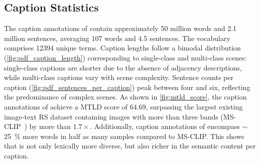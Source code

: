 \subsection{Caption Statistics\label{sec:statistics}}
The caption annotations of \bentxt{} contain approximately \num{50} million words and \num{2.1} million sentences, averaging 107 words and \num{4.5} sentences. 
The vocabulary comprises \num{12394} unique terms. 
Caption lengths follow a bimodal distribution (\cref{fig:pdf_caption_length}) corresponding to single-class and multi-class scenes: single-class captions are shorter due to the absence of adjacency descriptions, while multi-class captions vary with scene complexity. 
Sentence counts per caption (\cref{fig:pdf_sentences_per_caption}) peak between four and six, reflecting the predominance of complex scenes. 
As shown in \cref{fig:mtld_score}, the caption annotations of \bentxt{} achieve a \ac{MTLD} score of \num{64.69}, surpassing the largest existing image-text \ac{RS} dataset containing images with more than three bands (MS-CLIP~\cite{marimo2025beyond}) by more than $1.7\times$. 
Additionally, caption annotations of \bentxt{} encompass $\sim$\SI{25}{\percent} more words in half as many samples compared to MS-CLIP. This shows that \bentxt{} is not only lexically more diverse, but also richer in the semantic content per caption.

